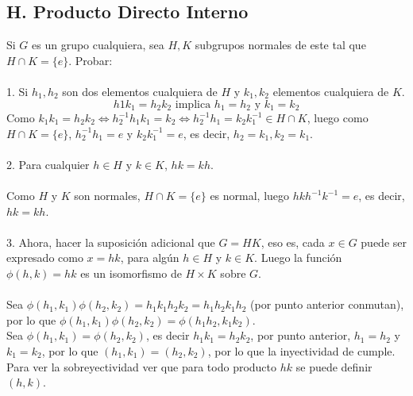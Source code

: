\documentclass{article}
\begin{document}
\subsection*{H. Producto Directo Interno}
Si $G$ es un grupo cualquiera, sea $H,K$ subgrupos normales de este tal que $H \cap K=\{e\}$. Probar:
\\
\\
1. Si $h_1,h_2$ son dos elementos cualquiera de $H$ y $k_1,k_2$ elementos cualquiera de $K$.
\begin{equation*}
    h1k_1=h_2k_2 \text{ implica }h_1=h_2 \text{ y } k_{1}=k_{2}
\end{equation*}
Como $k_1k_1=h_2k_2 \Longleftrightarrow h_{2}^{-1}h_{1}k_{1}=k_{2} \Longleftrightarrow h_{2}^{-1}h_{1}=k_{2}k_{1}^{-1} \in H \cap K$, luego como $H \cap K = \{e\}$, $h_{2}^{-1}h_{1}=e$ y $k_{2}k_{1}^{-1}=e$, es decir, $h_{2}=k_{1}, k_{2}=k_{1}$.
\\
\\
2. Para cualquier $h \in H$ y $k \in K$, $hk=kh$.
\\
\\
Como $H$ y $K$ son normales, $H \cap K=\{e\}$ es normal, luego $hkh^{-1}k^{-1}=e$, es decir, $hk=kh$.
\\
\\
3. Ahora, hacer la suposición adicional que $G=HK$, eso es, cada $x \in G$ puede ser expresado como $x=hk$, para algún $h \in H$ y $k \in K$. Luego la función $\phi(h,k)=hk$ es un isomorfismo de $H \times K$ sobre $G$.
\\
\\
Sea $\phi(h_1,k_1)\phi(h_2,k_2)=h_1k_1h_2k_2=h_1h_2k_1h_2$ (por punto anterior conmutan), por lo que $\phi(h_1,k_1)\phi(h_2,k_2)=\phi(h_1h_2,k_1k_2)$.
\\
Sea $\phi(h_1,k_1)=\phi(h_2,k_2)$, es decir $h_1k_1=h_2k_2$, por punto anterior, $h_1=h_2$ y $k_1=k_2$, por lo que $(h_1,k_1)=(h_2,k_2)$, por lo que la inyectividad de cumple. Para ver la sobreyectividad ver que para todo producto $hk$ se puede definir $(h,k)$.
\end{document}
